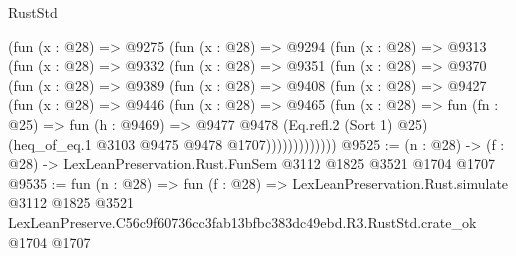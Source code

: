 \begin{lexlean}{RustStd}
\begin{coremodule}
    (fun (x : @28) =>
    @9275
      (fun (x : @28) =>
      @9294
        (fun (x : @28) =>
        @9313
          (fun (x : @28) =>
          @9332
            (fun (x : @28) =>
            @9351
              (fun (x : @28) =>
              @9370
                (fun (x : @28) =>
                @9389
                  (fun (x : @28) =>
                  @9408
                    (fun (x : @28) =>
                    @9427
                      (fun (x : @28) =>
                      @9446
                        (fun (x : @28) =>
                        @9465
                          (fun (x : @28) =>
                          fun (fn : @25) =>
                          fun (h : @9469) =>
                          @9477
                            @9478
                            (Eq.refl.{2} (Sort 1) @25)
                            (heq_of_eq.{1} @3103 @9475 @9478 @1707)))))))))))))
@9525 := (n : @28) -> (f : @28) -> LexLeanPreservation.Rust.FunSem @3112 @1825 @3521 @1704 @1707
@9535 := fun (n : @28) =>
  fun (f : @28) =>
  LexLeanPreservation.Rust.simulate
    @3112
    @1825
    @3521
    LexLeanPreserve.C56c9f60736cc3fab13bfbc383dc49ebd.R3.RustStd.crate_ok
    @1704
    @1707
\end{coremodule}
\end{lexlean}
